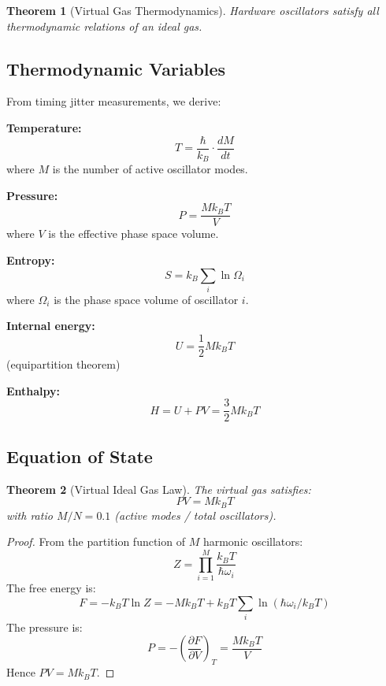\documentclass[aps,prl,twocolumn,superscriptaddress,floatfix]{revtex4-2}
\newtheorem{theorem}{Theorem}
\begin{document}
\begin{theorem}[Virtual Gas Thermodynamics]
Hardware oscillators satisfy all thermodynamic relations of an ideal gas.
\end{theorem}

\subsection{Thermodynamic Variables}

From timing jitter measurements, we derive:

\textbf{Temperature:}
\begin{equation}
T = \frac{\hbar}{k_B} \cdot \frac{dM}{dt}
\end{equation}
where $M$ is the number of active oscillator modes.

\textbf{Pressure:}
\begin{equation}
P = \frac{M k_B T}{V}
\end{equation}
where $V$ is the effective phase space volume.

\textbf{Entropy:}
\begin{equation}
S = k_B \sum_i \ln \Omega_i
\end{equation}
where $\Omega_i$ is the phase space volume of oscillator $i$.

\textbf{Internal energy:}
\begin{equation}
U = \frac{1}{2} M k_B T
\end{equation}
(equipartition theorem)

\textbf{Enthalpy:}
\begin{equation}
H = U + PV = \frac{3}{2} M k_B T
\end{equation}

\subsection{Equation of State}

\begin{theorem}[Virtual Ideal Gas Law]
The virtual gas satisfies:
\begin{equation}
PV = M k_B T
\end{equation}
with ratio $M/N = 0.1$ (active modes / total oscillators).
\end{theorem}

\begin{proof}
From the partition function of $M$ harmonic oscillators:
\begin{equation}
Z = \prod_{i=1}^M \frac{k_B T}{\hbar \omega_i}
\end{equation}
The free energy is:
\begin{equation}
F = -k_B T \ln Z = -M k_B T + k_B T \sum_i \ln(\hbar\omega_i/k_B T)
\end{equation}
The pressure is:
\begin{equation}
P = -\left(\frac{\partial F}{\partial V}\right)_T = \frac{M k_B T}{V}
\end{equation}
Hence $PV = M k_B T$.
\end{proof}
\end{document}
